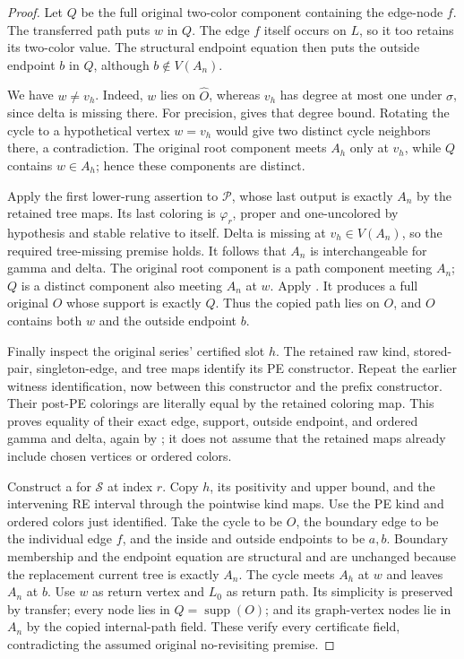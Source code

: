\begin{proof}
Let $Q$ be the full original two-color component containing the
edge-node $f$.  The transferred path puts $w$ in $Q$.  The edge $f$
itself occurs on $L$, so it too retains its two-color value.  The
structural endpoint equation then puts the outside endpoint $b$ in
$Q$, although $b\notin V(A_n)$.

We have $w\ne v_h$.  Indeed, $w$ lies on $\widehat O$, whereas $v_h$
has degree at most one under $\sigma$, since delta is missing there.
For precision,  gives that
degree bound.  Rotating the cycle to a hypothetical vertex
$w=v_h$ would give two distinct cycle neighbors there, a contradiction.
The original root component meets $A_h$ only at $v_h$, while $Q$
contains $w\in A_h$; hence these components are distinct.

Apply the first lower-rung assertion to $\mathcal P$, whose last output
is exactly $A_n$ by the retained tree maps.  Its last coloring is
$\varphi_r$, proper and one-uncolored by hypothesis and stable relative
to itself.  Delta is missing at $v_h\in V(A_n)$, so the required
tree-missing premise holds.  It follows that $A_n$ is interchangeable
for gamma and delta.  The original root component is a path component
meeting $A_n$; $Q$ is a distinct component also meeting $A_n$ at $w$.
Apply .  It
produces a full original  $O$ whose support is
exactly $Q$.  Thus the copied path lies on $O$, and $O$ contains both
$w$ and the outside endpoint $b$.

Finally inspect the original series' certified slot $h$.  The retained
raw kind, stored-pair, singleton-edge, and tree maps identify its PE
constructor.  Repeat the earlier witness identification, now between
this constructor and the prefix constructor.  Their post-PE colorings
are literally equal by the retained coloring map.  This proves equality
of their exact edge, support, outside endpoint, and ordered gamma and
delta, again by ; it does not
assume that the retained maps already include chosen vertices or
ordered colors.

Construct a  for $\mathcal S$
at index $r$.  Copy $h$, its positivity and upper bound, and the
intervening RE interval through the pointwise kind maps.  Use the PE
kind and ordered colors just identified.  Take the cycle to be $O$,
the boundary edge to be the individual edge $f$, and the inside and
outside endpoints to be $a,b$.  Boundary membership and the endpoint
equation are structural and are unchanged because the replacement
current tree is exactly $A_n$.  The cycle meets $A_h$ at $w$ and leaves
$A_n$ at $b$.  Use $w$ as return vertex and $L_0$ as return path.
Its simplicity is preserved by transfer; every node lies in
$Q=\operatorname{supp}(O)$; and its graph-vertex nodes lie in $A_n$
by the copied internal-path field.  These verify every certificate
field, contradicting the assumed original no-revisiting premise.
\end{proof}
